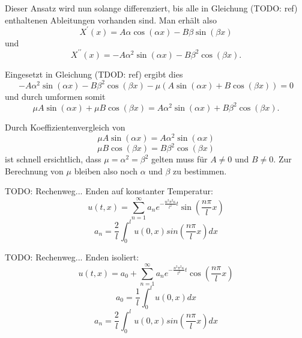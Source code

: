 Dieser Ansatz wird nun solange differenziert, bis alle in Gleichung (TODO: ref)
enthaltenen Ableitungen vorhanden sind. Man erhält also
\[
    X^{\prime}(x)
    =
    A \alpha \cos \left( \alpha x \right) -
    B \beta \sin \left( \beta x \right)
\]
und
\[
    X^{\prime \prime}(x)
    =
    -A \alpha^{2} \sin \left( \alpha x \right) -
    B \beta^{2} \cos \left( \beta x \right).
\]

Eingesetzt in Gleichung (TDOD: ref) ergibt dies
\[
    -A\alpha^{2}\sin(\alpha x) - B\beta^{2}\cos(\beta x) -
    \mu\left(A\sin(\alpha x) + B\cos(\beta x)\right)
    =
    0
\]
und durch umformen somit
\[
    \mu A\sin(\alpha x) + \mu B\cos(\beta x)
    =
    A\alpha^{2}\sin(\alpha x) + B\beta^{2}\cos(\beta x).
\]

Durch Koeffizientenvergleich von
\[
    \mu A\sin(\alpha x)
    =
    A\alpha^{2}\sin(\alpha x)
\]
\[
    \mu B\cos(\beta x)
    =
    B\beta^{2}\cos(\beta x)
\]
ist schnell ersichtlich, dass $ \mu = \alpha^{2} = \beta^{2} $ gelten muss für
$ A \neq 0 $ und $ B \neq 0 $. Zur Berechnung von $ \mu $ bleiben also noch 
$ \alpha $ und $ \beta $ zu bestimmen.

TODO: Rechenweg... Enden auf konstanter Temperatur:
\[
    u(t,x)
    =
    \sum_{n=1}^{\infty}a_{n}e^{-\frac{n^{2}\pi^{2}\kappa}{l^{2}}t}
    \sin\left(\frac{n\pi}{l}x\right)
\]
\[
    a_{n}
    =
    \frac{2}{l}\int_{0}^{l}u(0,x)sin\left(\frac{n\pi}{l}x\right) dx
\]

TODO: Rechenweg... Enden isoliert:
\[
    u(t,x)
    =
    a_{0} + \sum_{n=1}^{\infty}a_{n}e^{-\frac{n^{2}\pi^{2}\kappa}{l^{2}}t}
    \cos\left(\frac{n\pi}{l}x\right)
\]
\[
    a_{0}
    =
    \frac{1}{l}\int_{0}^{l}u(0,x) dx
\]
\[
    a_{n}
    =
    \frac{2}{l}\int_{0}^{l}u(0,x)sin\left(\frac{n\pi}{l}x\right) dx
\]
